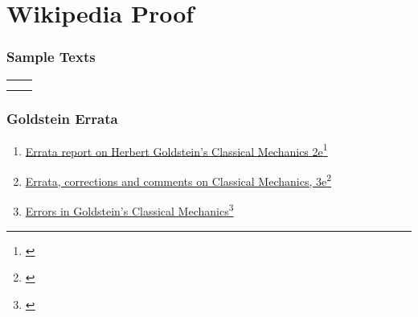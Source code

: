 % 
\section{Wikipedia Proof}
\begin{frame}\frametitle{Sample Texts}
\begin{table}[htp]
\begin{center}
\begin{tabular}{cc}
	\href{https://www.google.com/books/edition/Classical_Mechanics/9M8QAQAAIAAJ}{
	\begin{overpic}[ scale = 0.75]
		{\pLocalGraphics tombstones/goldstein-google}
	\end{overpic}}
	&
	\href{https://www.google.com/books/edition/Mechanics/JVk_4udwNtkC?hl=en}{
	\begin{overpic}[ scale = 0.75]
		{\pLocalGraphics tombstones/symon-google}
	\end{overpic}}
	\\
	{\scriptsize{\cite{goldstein2eclassical}}} &
	{\scriptsize{\cite{symon1971mechanics}}}
\end{tabular}
\end{center}
\label{tab:books}
\end{table}%
\end{frame}



\begin{frame}\frametitle{Goldstein Errata}
\begin{enumerate}
	\item \href{https://www.osti.gov/servlets/purl/6712863}{Errata report on Herbert Goldstein's Classical Mechanics 2e}\footnote{\cite{osti_6712863}}
	\item \href{http://astro.physics.sc.edu/goldstein/}{Errata, corrections and comments on Classical Mechanics, 3e}\footnote{\cite{goldstein3errata}}
	\item \href{https://pubs.aip.org/aapt/ajp/article-abstract/71/2/103/1055926/Errors-in-Goldstein-s-Classical-Mechanics?redirectedFrom=fulltext}{Errors in Goldstein’s Classical Mechanics}\footnote{\cite{tiersten2003errors}}
\end{enumerate}
\end{frame}


